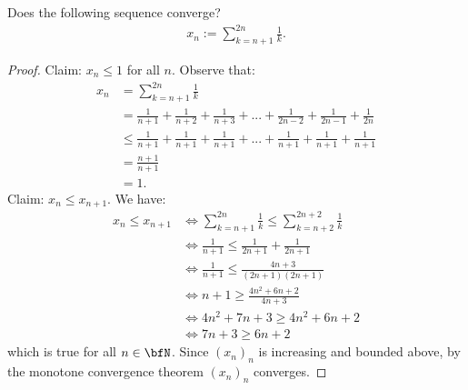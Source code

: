 \documentclass[10pt,twoside,openany]{memoir}
\begin{document}
    \begin{exercise}
        Does the following sequence converge?
            \begin{equation*}
            \begin{split}
                x_n := \sum_{k = n+1}^{2n} \frac{1}{k}.
            \end{split}
            \end{equation*}
    \end{exercise}
        \begin{proof}
            Claim: $x_n \leq 1$ for all $n$. Observe that:
                \begin{equation*}
                \begin{split}
                    x_n 
                    & = \sum_{k = n+1}^{2n} \frac{1}{k} \\
                    & = \frac{1}{n+1} + \frac{1}{n+2} + \frac{1}{n+3} + ... + \frac{1}{2n-2} + \frac{1}{2n-1} + \frac{1}{2n} \\
                    & \leq \frac{1}{n+1} + \frac{1}{n+1} + \frac{1}{n+1} + ... + \frac{1}{n+1} + \frac{1}{n+1} + \frac{1}{n+1} \\
                    & = \frac{n+1}{n+1} \\
                    & = 1.
                \end{split}
                \end{equation*}
            Claim: $x_{n} \leq x_{n+1}$. We have:
                \begin{equation*}
                \begin{split}
                    x_n \leq x_{n+1}
                    & \iff \sum_{k = n+1}^{2n} \frac{1}{k} \leq \sum_{k = n+2}^{2n+2}\frac{1}{k} \\
                    &\iff \frac{1}{n+1} \leq \frac{1}{2n+1} + \frac{1}{2n+1} \\
                    &\iff \frac{1}{n+1} \leq \frac{4n+3}{(2n+1)(2n+1)} \\
                    &\iff n+1  \geq \frac{4n^2 + 6n + 2}{4n+3}\\
                    &\iff 4n^2 + 7n +3 \geq 4n^2 + 6n + 2 \\
                    &\iff  7n + 3 \geq 6n + 2
                \end{split}
                \end{equation*}
            which is true for all $n \in \bfN$. Since $(x_n)_n$ is increasing and bounded above, by the monotone convergence theorem $(x_n)_n$ converges.
        \end{proof}
\end{document}
